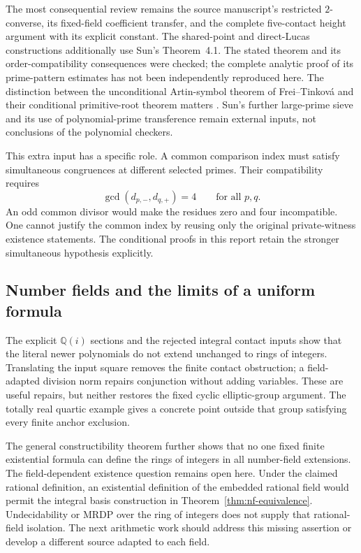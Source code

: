 The most consequential review remains the source manuscript's
restricted $2$-converse, its fixed-field coefficient transfer, and
the complete five-contact height argument with its explicit constant.
The shared-point and direct-Lucas constructions additionally use
Sun's Theorem~4.1. The stated theorem and its order-compatibility
consequences were checked; the complete analytic proof of its
prime-pattern estimates has not been independently reproduced here.
The distinction between the unconditional Artin-symbol theorem of
Frei--Tinkov\'a and their conditional primitive-root theorem matters
\cite{FreiTinkova2025}. Sun's further large-prime sieve and its use
of polynomial-prime transference \cite{TaoZiegler2018} remain external
inputs, not conclusions of the polynomial checkers.

This extra input has a specific role. A common comparison index must
satisfy simultaneous congruences at different selected primes. Their
compatibility requires
\[
                    \gcd(d_{p,-},d_{q,+})=4
                         \qquad\text{for all }p,q.
\]
An odd common divisor would make the residues zero and four
incompatible. One cannot justify the common index by reusing only the
original private-witness existence statements. The conditional proofs
in this report retain the stronger simultaneous hypothesis explicitly.

\subsection{Number fields and the limits of a uniform formula}

The explicit $\mathbb Q(i)$ sections and the rejected integral contact
inputs show that the literal newer polynomials do not extend unchanged
to rings of integers. Translating the input square removes the finite
contact obstruction; a field-adapted division norm repairs conjunction
without adding variables. These are useful repairs, but neither restores
the fixed cyclic elliptic-group argument. The totally real quartic
example gives a concrete point outside that group satisfying every
finite anchor exclusion.

The general constructibility theorem further shows that no one fixed
finite existential formula can define the rings of integers in all
number-field extensions. The field-dependent existence question remains
open here. Under the claimed rational definition, an existential
definition of the embedded rational field would permit the integral
basis construction in Theorem~\ref{thm:nf-equivalence}. Undecidability
or MRDP over the ring of integers does not supply that rational-field
isolation. The next arithmetic work should address this missing
assertion or develop a different source adapted to each field.
